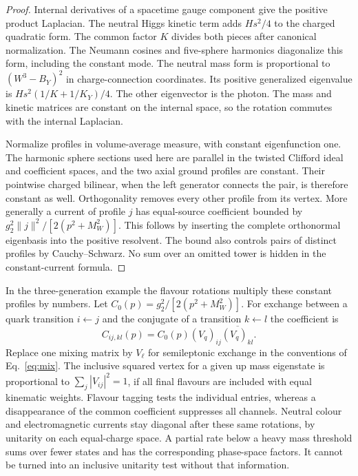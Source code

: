 \documentclass[aps,prd,reprint,onecolumn,nofootinbib,amsmath,amssymb]{revtex4-2}
\begin{document}
\begin{proof}
Internal derivatives of a spacetime gauge component give the positive product Laplacian. The neutral Higgs kinetic term adds $Hs^2/4$ to the charged quadratic form. The common factor $K$ divides both pieces after canonical normalization. The Neumann cosines and five-sphere harmonics diagonalize this form, including the constant mode. The neutral mass form is proportional to $(W^3-B_Y)^2$ in charge-connection coordinates. Its positive generalized eigenvalue is $Hs^2(1/K+1/K_Y)/4$. The other eigenvector is the photon. The mass and kinetic matrices are constant on the internal space, so the rotation commutes with the internal Laplacian.

Normalize profiles in volume-average measure, with constant eigenfunction one. The harmonic sphere sections used here are parallel in the twisted Clifford ideal and coefficient spaces, and the two axial ground profiles are constant. Their pointwise charged bilinear, when the left generator connects the pair, is therefore constant as well. Orthogonality removes every other profile from its vertex. More generally a current of profile $j$ has equal-source coefficient bounded by $g_2^2\|j\|^2/[2(p^2+M_W^2)]$. This follows by inserting the complete orthonormal eigenbasis into the positive resolvent. The bound also controls pairs of distinct profiles by Cauchy--Schwarz. No sum over an omitted tower is hidden in the constant-current formula.
\end{proof}

In the three-generation example the flavour rotations multiply these constant profiles by numbers. Let $C_0(p)=g_2^2/[2(p^2+M_W^2)]$. For exchange between a quark transition $i\leftarrow j$ and the conjugate of a transition $k\leftarrow l$ the coefficient is
\begin{equation}
 C_{ij,kl}(p)=C_0(p)(V_q)_{ij}\overline{(V_q)_{kl}} .
\end{equation}
Replace one mixing matrix by $V_\ell$ for semileptonic exchange in the conventions of Eq.~\eqref{eq:mix}. The inclusive squared vertex for a given up mass eigenstate is proportional to $\sum_j|V_{ij}|^2=1$, if all final flavours are included with equal kinematic weights. Flavour tagging tests the individual entries, whereas a disappearance of the common coefficient suppresses all channels. Neutral colour and electromagnetic currents stay diagonal after these same rotations, by unitarity on each equal-charge space. A partial rate below a heavy mass threshold sums over fewer states and has the corresponding phase-space factors. It cannot be turned into an inclusive unitarity test without that information.
\end{document}
